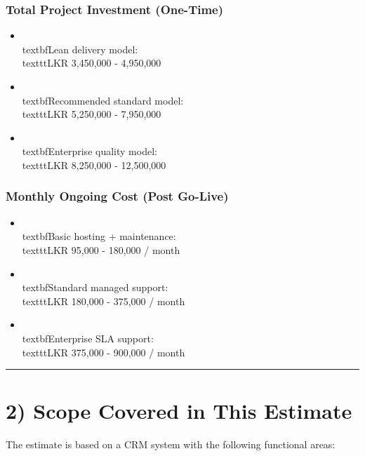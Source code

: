 \documentclass[11pt,a4paper]{article}
\begin{document}
\subsubsection{Total Project Investment (One-Time)}

\begin{itemize}
\item \\textbf{Lean delivery model:} \\texttt{LKR 3,450,000 - 4,950,000}
\item \\textbf{Recommended standard model:} \\texttt{LKR 5,250,000 - 7,950,000}
\item \\textbf{Enterprise quality model:} \\texttt{LKR 8,250,000 - 12,500,000}
\end{itemize}

\subsubsection{Monthly Ongoing Cost (Post Go-Live)}

\begin{itemize}
\item \\textbf{Basic hosting + maintenance:} \\texttt{LKR 95,000 - 180,000 / month}
\item \\textbf{Standard managed support:} \\texttt{LKR 180,000 - 375,000 / month}
\item \\textbf{Enterprise SLA support:} \\texttt{LKR 375,000 - 900,000 / month}
\end{itemize}

\bigskip\hrule\bigskip

\section{2) Scope Covered in This Estimate}

The estimate is based on a CRM system with the following functional areas:\\
\end{document}
